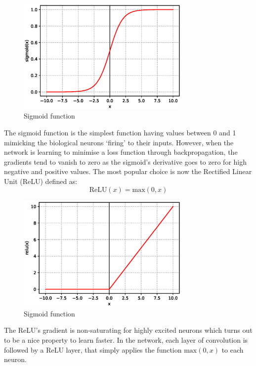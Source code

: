 \begin{figure}[H]
\centering
\includegraphics[width=0.75\textwidth]{Images/sigmoid.eps}
\caption{Sigmoid function}
\end{figure}

The sigmoid function is the simplest function having values between 0 and 1 mimicking the biological neurons `firing' to their inputs. However, when the network is learning to minimise a loss function through backpropagation, the gradients tend to vanish to zero as the sigmoid's derivative goes to zero for high negative and positive values. The most popular choice is now the Rectified Linear Unit (ReLU) defined as:
\begin{equation}
\text{ReLU}(x) = \text{max}(0,x)
\end{equation}

\begin{figure}[H]
\centering
\includegraphics[width=0.75\textwidth]{Images/relu.eps}
\caption{Sigmoid function}
\end{figure}

The ReLU's gradient is non-saturating for highly excited neurons which turns out to be a nice property to learn faster. In the network, each layer of convolution is followed by a ReLU layer, that simply applies the function $\text{max}(0,x)$ to each neuron.

